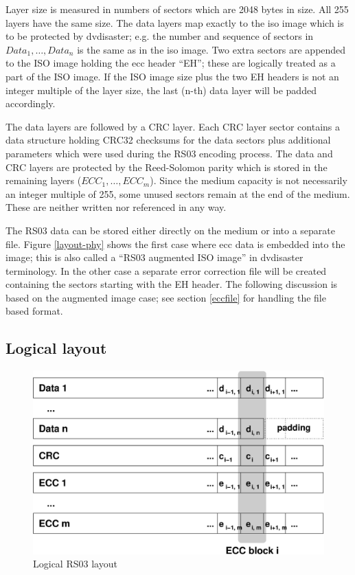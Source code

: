 Layer size is measured in numbers of sectors which are 2048 bytes in size. All
255 layers have the same size. The data layers map exactly 
to the iso image which is to be protected by dvdisaster; 
e.g. the number and sequence of sectors in $Data_1,\ldots,Data_n$
is the same as in the iso image. Two extra sectors are appended to the ISO image
holding the ecc header ``EH''; these are logically treated as a part of the ISO image.
If the ISO image size plus the two EH headers is not an integer multiple
of the layer size, the last (n-th) data layer will be padded accordingly.  

The data layers are followed by a CRC layer. Each CRC layer sector contains a
data structure holding CRC32 checksums for the data sectors plus additional
parameters which were used during the RS03 encoding process.
The data and CRC layers are protected by the
Reed-Solomon parity which is stored in the remaining layers ($ECC_1,\ldots,ECC_m$).
Since the medium capacity is not necessarily an integer multiple of 255, some
unused sectors remain at the end of the medium. These are neither written nor
referenced in any way.

\smallskip

The RS03 data can be stored either directly on the medium or into a separate file.
Figure \ref{layout-phy} shows the first case where ecc data is embedded into the
image; this is also called a ``RS03 augmented ISO image'' in dvdisaster
terminology. 
In the other case a separate error correction file will be created containing
the sectors starting with the EH header. The following discussion is based
on the augmented image case; see section \ref{eccfile} for handling the
file based format.

\subsection{Logical layout}

\begin{figure}
 \begin{center}
 \includegraphics[width=\textwidth]{layer.eps}
 \caption{Logical RS03 layout}
 \label{layout-logical}
 \end{center}
\end{figure}


